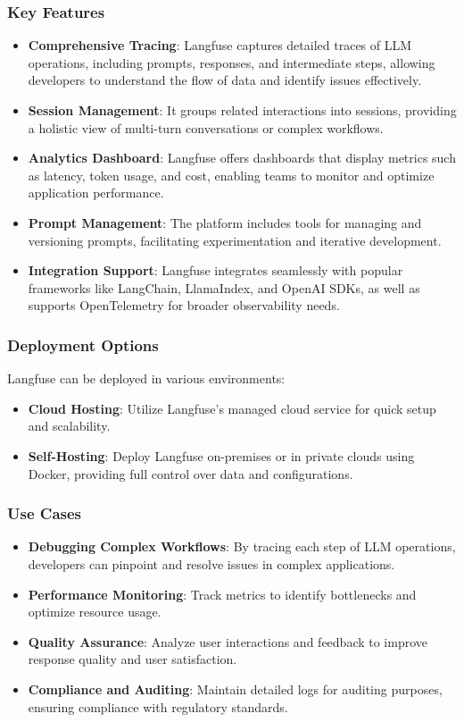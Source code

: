 \subsubsection{Key Features}
\begin{itemize}
    \item \textbf{Comprehensive Tracing}: Langfuse captures detailed traces of LLM operations, including prompts, responses, and intermediate steps, allowing developers to understand the flow of data and identify issues effectively.
    \item \textbf{Session Management}: It groups related interactions into sessions, providing a holistic view of multi-turn conversations or complex workflows.
    \item \textbf{Analytics Dashboard}: Langfuse offers dashboards that display metrics such as latency, token usage, and cost, enabling teams to monitor and optimize application performance.
    \item \textbf{Prompt Management}: The platform includes tools for managing and versioning prompts, facilitating experimentation and iterative development.
    \item \textbf{Integration Support}: Langfuse integrates seamlessly with popular frameworks like LangChain, LlamaIndex, and OpenAI SDKs, as well as supports OpenTelemetry for broader observability needs.
\end{itemize}

\subsubsection{Deployment Options}
Langfuse can be deployed in various environments:

\begin{itemize}
    \item \textbf{Cloud Hosting}: Utilize Langfuse’s managed cloud service for quick setup and scalability.
    \item \textbf{Self-Hosting}: Deploy Langfuse on-premises or in private clouds using Docker, providing full control over data and configurations.
\end{itemize}

\subsubsection{Use Cases}
\begin{itemize}
    \item \textbf{Debugging Complex Workflows}: By tracing each step of LLM operations, developers can pinpoint and resolve issues in complex applications.
    \item \textbf{Performance Monitoring}: Track metrics to identify bottlenecks and optimize resource usage.
    \item \textbf{Quality Assurance}: Analyze user interactions and feedback to improve response quality and user satisfaction.
    \item \textbf{Compliance and Auditing}: Maintain detailed logs for auditing purposes, ensuring compliance with regulatory standards.
\end{itemize}

